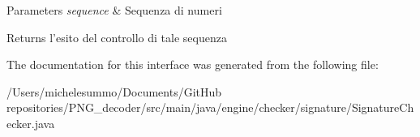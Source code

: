 \begin{DoxyParams}{Parameters}
{\em sequence} & Sequenza di numeri \\
\hline
\end{DoxyParams}
\begin{DoxyReturn}{Returns}
l'esito del controllo di tale sequenza 
\end{DoxyReturn}


The documentation for this interface was generated from the following file\-:\begin{DoxyCompactItemize}
\item 
/\-Users/michelesummo/\-Documents/\-Git\-Hub repositories/\-P\-N\-G\-\_\-decoder/src/main/java/engine/checker/signature/Signature\-Checker.\-java\end{DoxyCompactItemize}
